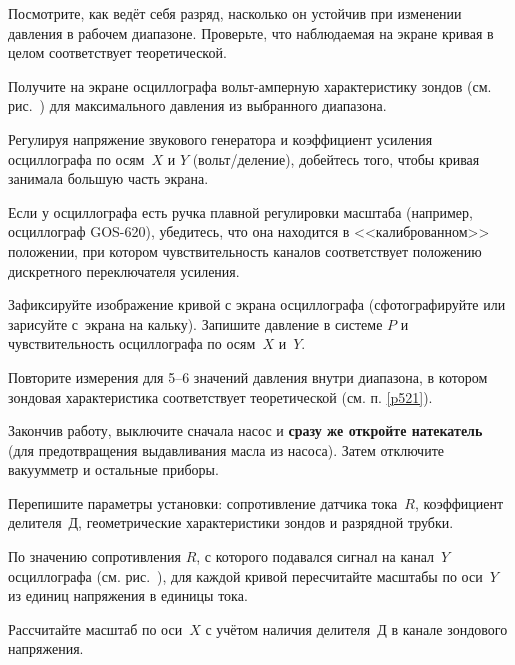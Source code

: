 \begin{lab:task}
\item \label{p521} Посмотрите, как ведёт себя разряд, насколько он устойчив при изменении
давления в рабочем диапазоне. Проверьте, что наблюдаемая 
на экране кривая в целом соответствует теоретической.


\item Получите на экране осциллографа вольт-амперную характеристику зондов
(см. рис.~) для максимального давления из
выбранного диапазона.

\item Регулируя напряжение звукового генератора и коэффициент усиления 
осциллографа по осям~$X$ и $Y$ (вольт/деление), 
добейтесь того, чтобы кривая занимала большую часть экрана. 

Если у осциллографа есть ручка плавной регулировки масштаба
(например, осциллограф GOS-620), убедитесь, что она находится в 
<<калиброванном>> положении, при котором чувствительность каналов 
соответствует положению дискретного переключателя усиления.

\item Зафиксируйте изображение кривой с экрана осциллографа 
(сфотографируйте или зарисуйте с~экрана на кальку). 
Запишите давление в системе $P$ и чувствительность осциллографа по 
осям~$X$ и~$Y$.

\item Повторите измерения для 5--6 значений давления внутри диапазона, 
в котором зондовая характеристика соответствует теоретической
(см. п. \ref{p521}).

\item Закончив работу, выключите сначала насос и \textbf{сразу же откройте натекатель}
(для предотвращения выдавливания масла из насоса).
Затем отключите вакуумметр и остальные приборы.

\item Перепишите параметры установки: сопротивление датчика тока~$R$, коэффициент
делителя~Д, геометрические характеристики зондов и разрядной трубки.


\item По значению сопротивления $R$, с которого подавался
сигнал на канал~$Y$ осциллографа  (см. рис.~), 
для каждой кривой пересчитайте масштабы по оси~$Y$ из единиц
напряжения в единицы тока.
 
Рассчитайте масштаб по оси~$X$ с учётом наличия делителя~Д в канале 
зондового напряжения.


\end{lab:task}
